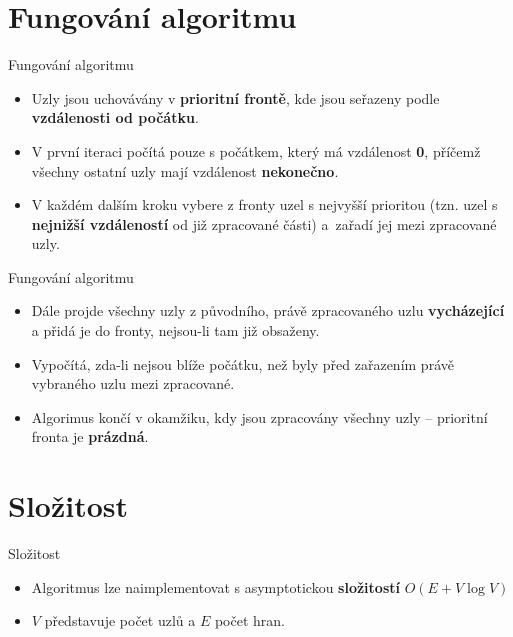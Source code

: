 \documentclass[10pt, hyperref={unicode}]{beamer}
\begin{document}
    \section{Fungování algoritmu}
    \begin{frame}{Fungování algoritmu}
        \begin{itemize}
            \item<1-> Uzly jsou uchovávány v \textbf{prioritní frontě}, kde jsou seřazeny podle \textbf{vzdálenosti od počátku}.
            \item<2-> V první iteraci počítá pouze s počátkem, který má vzdálenost \textbf{0}, příčemž všechny ostatní uzly mají vzdálenost \textbf{nekonečno}.
            \item<3-> V každém dalším kroku vybere z fronty uzel s nejvyšší prioritou (tzn. uzel s \textbf{nejnižší vzdáleností} od již zpracované části) a~zařadí jej mezi zpracované uzly. 
            \end{itemize}
    \end{frame}
    \begin{frame}{Fungování algoritmu}
        \begin{itemize}
            \item<1-> Dále projde všechny uzly z původního, právě zpracovaného uzlu \textbf{vycházející} a přidá je do fronty, nejsou-li tam již obsaženy.
            \item<2-> Vypočítá, zda-li nejsou blíže počátku, než byly před zařazením právě vybraného uzlu mezi zpracované.
            \item<3-> Algorimus končí v okamžiku, kdy jsou zpracovány všechny uzly -- prioritní fronta je \textbf{prázdná}.
        \end{itemize}
    \end{frame}
    
    \section{Složitost}
    \begin{frame}[fragile]{Složitost}
        \begin{itemize}
            \item<1-> Algoritmus lze naimplementovat s asymptotickou \textbf{složitostí} $O (E + V\log V)$
            \item<2-> $V$ představuje počet uzlů a $E$ počet hran.
        \end{itemize}
    \end{frame}
    
\end{document}
